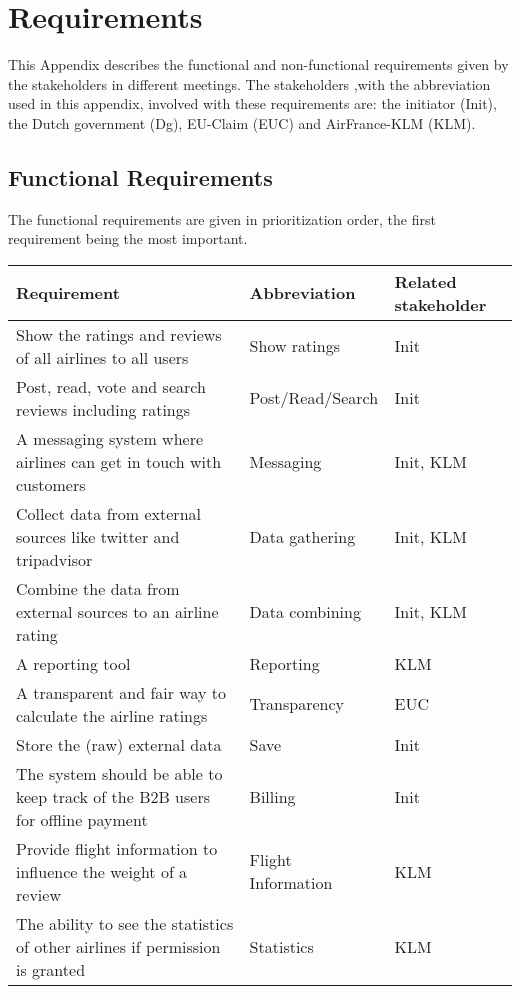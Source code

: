 \section{Requirements}
This Appendix describes the functional and non-functional requirements given by the stakeholders in different meetings. The stakeholders ,with the abbreviation used in this appendix, involved with these requirements are: the initiator (Init), the Dutch government (Dg), EU-Claim (EUC) and AirFrance-KLM (KLM). 

\subsection*{Functional Requirements}
The functional requirements are given in prioritization order, the first requirement being the most important. 

\label{requir}
\begin{longtable}{| p{10cm}| l | l |}
\hline
\textbf{Requirement} & \textbf{Abbreviation} & \textbf{Related stakeholder} \\ \hline
Show the ratings and reviews of all airlines to all users & Show ratings & Init \\ \hline
Post, read, vote and search reviews including ratings & Post/Read/Search & Init \\ \hline
A messaging system where airlines can get in touch with customers & Messaging & Init, KLM \\ \hline
Collect data from external sources like twitter and tripadvisor & Data gathering & Init, KLM \\ \hline
Combine the data from external sources to an airline rating & Data combining & Init, KLM \\ \hline
A reporting tool & Reporting & KLM \\ \hline
A transparent and fair way to calculate the airline ratings & Transparency & EUC \\ \hline
Store the (raw) external data & Save & Init \\ \hline
The system should be able to keep track of the B2B users for offline payment & Billing & Init \\ \hline
Provide flight information to influence the weight of a review & Flight Information & KLM \\ \hline
The ability to see the statistics of other airlines if permission is granted & Statistics & KLM \\ \hline 

\end{longtable}

